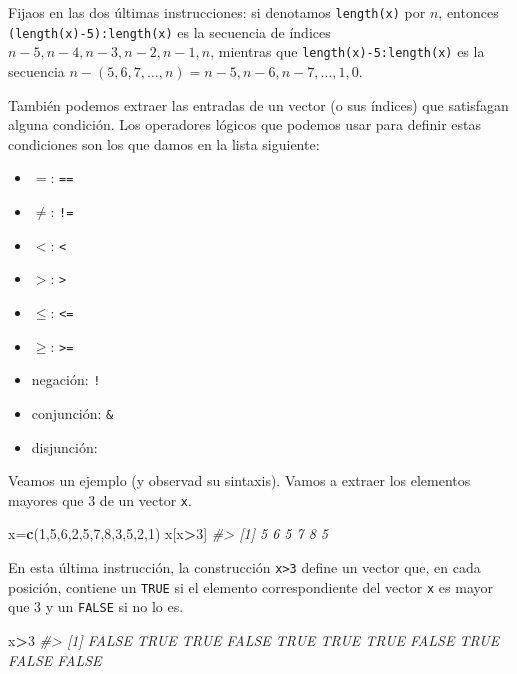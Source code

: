 \documentclass[
]{book}
\newenvironment{Shaded}{\begin{snugshade}}{\end{snugshade}}
\newcommand{\CommentTok}[1]{\textcolor[rgb]{0.56,0.35,0.01}{\textit{#1}}}
\newcommand{\DecValTok}[1]{\textcolor[rgb]{0.00,0.00,0.81}{#1}}
\newcommand{\KeywordTok}[1]{\textcolor[rgb]{0.13,0.29,0.53}{\textbf{#1}}}
\newcommand{\NormalTok}[1]{#1}
\newcommand{\OperatorTok}[1]{\textcolor[rgb]{0.81,0.36,0.00}{\textbf{#1}}}
\providecommand{\tightlist}{%
  \setlength{\itemsep}{0pt}\setlength{\parskip}{0pt}}
\theoremstyle{definition}
\theoremstyle{definition}
\theoremstyle{definition}
\theoremstyle{remark}
\begin{document}
Fijaos en las dos últimas instrucciones: si denotamos \texttt{length(x)} por \(n\), entonces
\texttt{(length(x)-5):length(x)} es la secuencia de índices
\(n-5, n-4, n-3, n-2, n-1, n\), mientras que \texttt{length(x)-5:length(x)} es la secuencia
\(n-(5, 6, 7, \ldots, n)=n-5, n-6, n-7, \ldots, 1, 0\).

También podemos extraer las entradas de un vector (o sus índices) que satisfagan alguna condición. Los operadores lógicos que podemos usar para definir estas condiciones son los que damos en la lista siguiente:

\begin{itemize}
\tightlist
\item
  \(=\): \texttt{==}
\item
  \(\neq\): \texttt{!=}
\item
  \(<\): \texttt{\textless{}}
\item
  \(>\): \texttt{\textgreater{}}
\item
  \(\leqslant\): \texttt{\textless{}=}
\item
  \(\geqslant\): \texttt{\textgreater{}=}
\item
  negación: \texttt{!}
\item
  conjunción: \texttt{\&}
\item
  disjunción: \texttt{\textbar{}}
\end{itemize}

Veamos un ejemplo (y observad su sintaxis). Vamos a extraer los elementos mayores que 3 de un vector \texttt{x}.

\begin{Shaded}
\begin{Highlighting}[]
\NormalTok{x=}\KeywordTok{c}\NormalTok{(}\DecValTok{1}\NormalTok{,}\DecValTok{5}\NormalTok{,}\DecValTok{6}\NormalTok{,}\DecValTok{2}\NormalTok{,}\DecValTok{5}\NormalTok{,}\DecValTok{7}\NormalTok{,}\DecValTok{8}\NormalTok{,}\DecValTok{3}\NormalTok{,}\DecValTok{5}\NormalTok{,}\DecValTok{2}\NormalTok{,}\DecValTok{1}\NormalTok{)}
\NormalTok{x[x}\OperatorTok{\textgreater{}}\DecValTok{3}\NormalTok{]}
\CommentTok{\#\textgreater{} [1] 5 6 5 7 8 5}
\end{Highlighting}
\end{Shaded}

En esta última instrucción, la construcción \texttt{x\textgreater{}3} define un vector que, en cada posición, contiene un \texttt{TRUE} si el elemento correspondiente del vector \texttt{x} es mayor que 3 y un \texttt{FALSE} si no lo es.

\begin{Shaded}
\begin{Highlighting}[]
\NormalTok{x}\OperatorTok{\textgreater{}}\DecValTok{3}
\CommentTok{\#\textgreater{}  [1] FALSE  TRUE  TRUE FALSE  TRUE  TRUE  TRUE FALSE  TRUE FALSE FALSE}
\end{Highlighting}
\end{Shaded}
\end{document}
